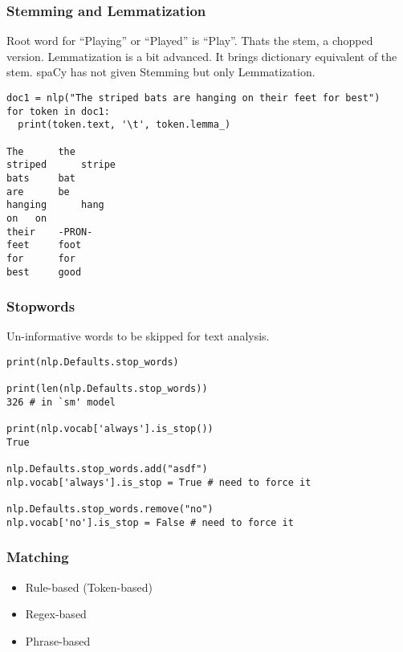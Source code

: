 \begin{frame}[fragile]\frametitle{ Stemming and Lemmatization}

Root word for ``Playing'' or ``Played'' is ``Play''. Thats the stem, a chopped version. Lemmatization is a bit advanced. It brings dictionary equivalent of the stem. spaCy has not given Stemming but only Lemmatization.


\begin{lstlisting}
doc1 = nlp("The striped bats are hanging on their feet for best")
for token in doc1:
  print(token.text, '\t', token.lemma_)
	
The 	 the
striped 	 stripe
bats 	 bat
are 	 be
hanging 	 hang
on 	 on
their 	 -PRON-
feet 	 foot
for 	 for
best 	 good
\end{lstlisting}


\end{frame}

\begin{frame}[fragile]\frametitle{Stopwords}
Un-informative words to be skipped for text analysis.

\begin{lstlisting}
print(nlp.Defaults.stop_words)

print(len(nlp.Defaults.stop_words))
326 # in `sm' model

print(nlp.vocab['always'].is_stop())
True

nlp.Defaults.stop_words.add("asdf")
nlp.vocab['always'].is_stop = True # need to force it

nlp.Defaults.stop_words.remove("no")
nlp.vocab['no'].is_stop = False # need to force it

\end{lstlisting}

\end{frame}

\begin{frame}[fragile]\frametitle{Matching }

  \begin{itemize}
    \item Rule-based (Token-based)
		\item Regex-based
		\item Phrase-based
  \end{itemize}
	

\end{frame}




